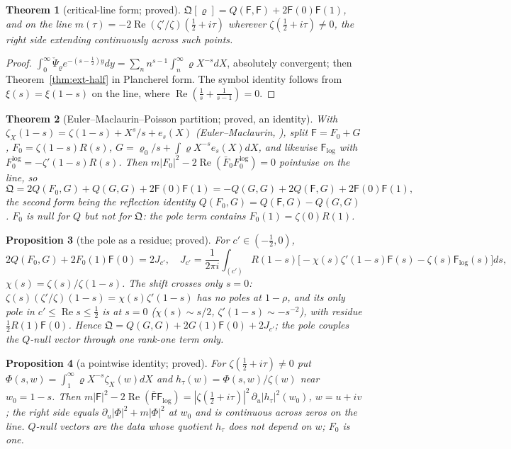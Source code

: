 \documentclass[11pt]{amsart}
\newtheorem{theorem}{Theorem}[section]
\newtheorem{proposition}[theorem]{Proposition}
\theoremstyle{definition}
\theoremstyle{remark}
\newcommand{\Rel}{\operatorname{Re}}
\begin{document}
\begin{theorem}[critical-line form; proved]\label{thm:ext-line}
$\mathfrak Q[\varrho]=Q(\mathsf F,\mathsf F)+2\mathsf F(0)\mathsf F(1)$, and on the line $m(\tau)=-2\Rel(\zeta'/\zeta)(\frac12+i\tau)$ wherever
$\zeta(\frac12+i\tau)\ne0$, the right side extending continuously across such points.
\end{theorem}
\begin{proof}
$\int_0^\infty\check\Psi_\varrho e^{-(s-\frac12)y}dy=\sum_nn^{s-1}\int_n^\infty\varrho X^{-s}dX$, absolutely convergent; then
Theorem~\ref{thm:ext-half} in Plancherel form. The symbol identity follows from $\xi(s)=\xi(1-s)$ on the line, where
$\Rel(\frac1s+\frac1{s-1})=0$.
\end{proof}

\begin{theorem}[Euler--Maclaurin--Poisson partition; proved, an identity]\label{thm:ext-EM}
With $\zeta_X(1-s)=\zeta(1-s)+X^s/s+e_s(X)$ (Euler--Maclaurin, \cite[\S3.5]{Titchmarsh1986}), split
$\mathsf F=F_0+G$, $F_0=\zeta(1-s)R(s)$, $G=\varrho_0/s+\int\varrho X^{-s}e_s(X)dX$, and likewise $\mathsf F_{\log}$ with
$F_0^{\log}=-\zeta'(1-s)R(s)$. Then $m|F_0|^2-2\Rel(\bar F_0F_0^{\log})=0$ pointwise on the line, so
\[
\mathfrak Q=2Q(F_0,G)+Q(G,G)+2\mathsf F(0)\mathsf F(1)=-Q(G,G)+2Q(\mathsf F,G)+2\mathsf F(0)\mathsf F(1),
\]
the second form being the reflection identity $Q(F_0,G)=Q(\mathsf F,G)-Q(G,G)$. $F_0$ is null for $Q$ but not for $\mathfrak Q$:
the pole term contains $F_0(1)=\zeta(0)R(1)$.
\end{theorem}

\begin{proposition}[the pole as a residue; proved]\label{prop:ext-residue}
For $c'\in(-\frac12,0)$,
\[
2Q(F_0,G)+2F_0(1)\mathsf F(0)=2J_{c'},\quad
J_{c'}=\frac1{2\pi i}\int_{(c')}R(1-s)\big[-\chi(s)\zeta'(1-s)\mathsf F(s)-\zeta(s)\mathsf F_{\log}(s)\big]ds,
\]
$\chi(s)=\zeta(s)/\zeta(1-s)$. The shift crosses only $s=0$: $\zeta(s)(\zeta'/\zeta)(1-s)=\chi(s)\zeta'(1-s)$ has no poles at
$1-\rho$, and its only pole in $c'\le\Rel s\le\frac12$ is at $s=0$ ($\chi(s)\sim s/2$, $\zeta'(1-s)\sim-s^{-2}$), with residue
$\frac12R(1)\mathsf F(0)$. Hence $\mathfrak Q=Q(G,G)+2G(1)\mathsf F(0)+2J_{c'}$; the pole couples the $Q$-null vector through one
rank-one term only.
\end{proposition}

\begin{proposition}[a pointwise identity; proved]\label{prop:ext-pointwise}
For $\zeta(\frac12+i\tau)\ne0$ put $\Phi(s,w)=\int_1^\infty\varrho X^{-s}\zeta_X(w)dX$ and $h_\tau(w)=\Phi(s,w)/\zeta(w)$ near
$w_0=1-s$. Then $m|\mathsf F|^2-2\Rel(\bar{\mathsf F}\mathsf F_{\log})=|\zeta(\frac12+i\tau)|^2\,\partial_u|h_\tau|^2(w_0)$, $w=u+iv$; the
right side equals $\partial_u|\Phi|^2+m|\Phi|^2$ at $w_0$ and is continuous across zeros on the line. $Q$-null vectors are the data
whose quotient $h_\tau$ does not depend on $w$; $F_0$ is one.
\end{proposition}
\end{document}
